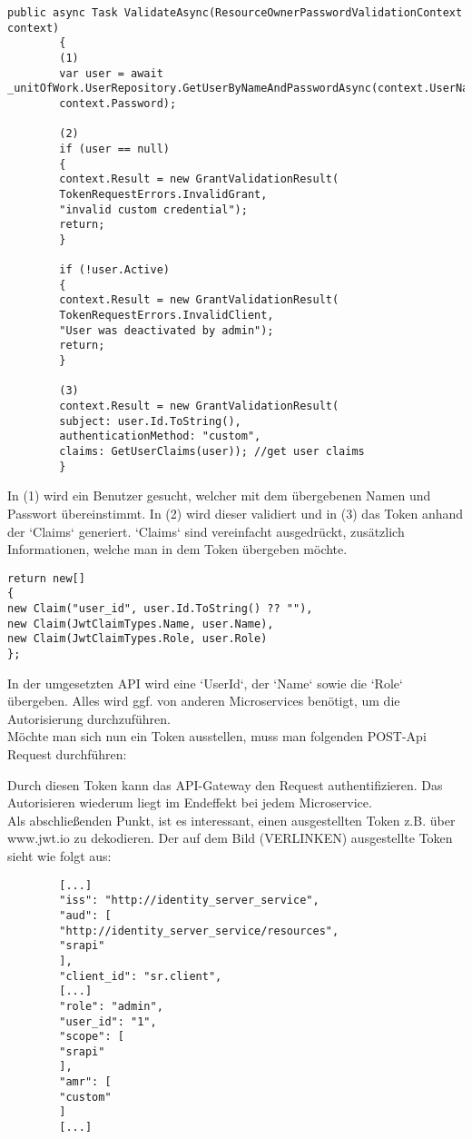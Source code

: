 \begin{verbatim}
public async Task ValidateAsync(ResourceOwnerPasswordValidationContext context)
		{
		(1)
		var user = await _unitOfWork.UserRepository.GetUserByNameAndPasswordAsync(context.UserName,
		context.Password);
		
		(2)
		if (user == null)
		{
		context.Result = new GrantValidationResult(
		TokenRequestErrors.InvalidGrant,
		"invalid custom credential");
		return;
		}
		
		if (!user.Active)
		{
		context.Result = new GrantValidationResult(
		TokenRequestErrors.InvalidClient,
		"User was deactivated by admin");
		return;
		}
		
		(3)
		context.Result = new GrantValidationResult(
		subject: user.Id.ToString(),
		authenticationMethod: "custom",
		claims: GetUserClaims(user)); //get user claims
		}
\end{verbatim}

In (1) wird ein Benutzer gesucht, welcher mit dem übergebenen Namen und Passwort übereinstimmt. In (2) wird dieser validiert und in (3) das Token anhand der `Claims` generiert. `Claims` sind vereinfacht ausgedrückt, zusätzlich Informationen, welche man in dem Token übergeben möchte. 

\begin{verbatim}
return new[]
{
new Claim("user_id", user.Id.ToString() ?? ""),
new Claim(JwtClaimTypes.Name, user.Name),
new Claim(JwtClaimTypes.Role, user.Role)
};
\end{verbatim}

In der umgesetzten API wird eine `UserId`, der `Name` sowie die `Role` übergeben. Alles wird ggf. von anderen Microservices benötigt, um die Autorisierung durchzuführen.\\

Möchte man sich nun ein Token ausstellen, muss man folgenden POST-Api Request durchführen: 

Durch diesen Token kann das API-Gateway den Request authentifizieren. Das Autorisieren wiederum liegt im Endeffekt bei jedem Microservice. \\

Als abschließenden Punkt, ist es interessant, einen ausgestellten Token z.B. über www.jwt.io zu dekodieren. Der auf dem Bild (VERLINKEN) ausgestellte Token sieht wie folgt aus:

\begin{verbatim}
		[...]
		"iss": "http://identity_server_service",
		"aud": [
		"http://identity_server_service/resources",
		"srapi"
		],
		"client_id": "sr.client",
		[...]
		"role": "admin",
		"user_id": "1",
		"scope": [
		"srapi"
		],
		"amr": [
		"custom"
		]
		[...]
\end{verbatim}  


